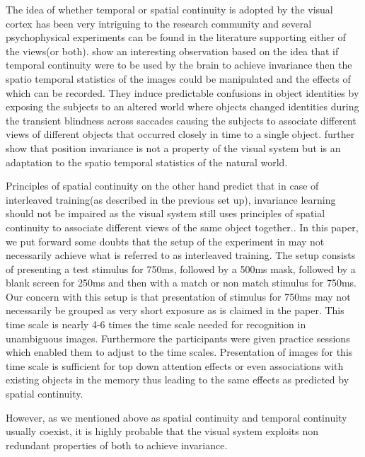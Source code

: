 \documentclass[12pt,twoside]{article}
\theoremstyle{plain}
\theoremstyle{definition}
\theoremstyle{remark}
\begin{document}
The idea of whether temporal or spatial continuity is adopted by the visual cortex has been very intriguing to the research community and several psychophysical experiments can be found in the literature supporting either of the views(or both). \cite{DavidDCox2005} show an interesting observation based on the idea that if temporal continuity were to be used by the brain to achieve invariance then the spatio temporal statistics of the images could be manipulated and the effects of which can be recorded. They induce predictable confusions in object identities by exposing the subjects to an altered world where objects changed identities during the transient blindness across saccades causing the subjects to associate different views of different objects that occurred closely in time to a single object.\cite{DavidDCox2005} further show that position invariance is not a property of the visual system but is an adaptation to the spatio temporal statistics of the natural world. 

Principles of spatial continuity on the other hand predict that in case of interleaved training(as described in the previous set up), invariance learning should not be impaired as the visual system still uses principles of spatial continuity to associate different views of the same object together.\cite{GavinPerry2008}. In this paper, we put forward some doubts that the setup of the experiment in \cite{GavinPerry2008} may not necessarily achieve what is referred to as interleaved training. The setup consists of presenting a test stimulus for 750ms, followed by a 500ms mask, followed by a blank screen for 250ms and then with a match or non match stimulus for 750ms. Our concern with this setup is that presentation of stimulus for 750ms may not necessarily be grouped as very short exposure as is claimed in the paper. This time scale is nearly 4-6 times the time scale needed for recognition in unambiguous images. Furthermore the participants were given practice sessions which enabled them to adjust to the time scales. Presentation of images for this time scale is sufficient for top down attention effects or even associations with existing objects in the memory thus leading to the same effects as predicted by spatial continuity.

However, as we mentioned above as spatial continuity and temporal continuity usually coexist, it is highly probable that the visual system exploits non redundant properties of both to achieve invariance.
\end{document}
